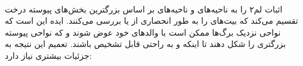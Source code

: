 \documentclass[a4paper]{article}
\begin{document}
	\paragraph{}
	اثبات لم۲ 
	را به ناحیه‌های
	و ناحیه‌های 
	بر اساس بزرگترین بخش‌های پیوسته درخت تقسیم می‌کند که بیت‌های را به طور انحصاری از 
	یا
	بررسی می‌کنند. ایده این است که نواحی نزدیک برگ‌ها ممکن است با والد‌های خود عوض شوند و که نواحی پیوسته بزرگتری
	را شکل دهند تا اینکه 
	و 
	به راحتی قابل تشخیص باشند. تعمیم این نتیجه به جزئیات بیشتری نیاز دارد:
\end{document}
